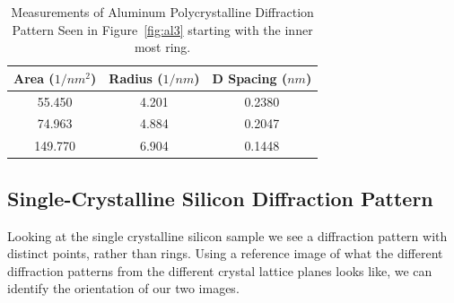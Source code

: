 \documentclass[12pt,a4paper]{article}
\begin{document}
\begin{table}[hct]
  \centering
  \begin{tabular}{c|c|c}
    \hline
    \hline
    Area ($1/nm^2$) & Radius ($1/nm$) & D Spacing ($nm$) \\
    \hline
    55.450 & 4.201 & 0.2380 \\
    74.963 & 4.884 & 0.2047 \\
    149.770 & 6.904   & 0.1448 \\
    \hline
    \hline
  \end{tabular}
  \caption{Measurements of Aluminum Polycrystalline Diffraction Pattern Seen in Figure~\ref{fig:al3} starting with the inner most ring.}
  \label{tbl:rings}
\end{table}



\subsection{Single-Crystalline Silicon Diffraction Pattern} %
\label{sub:single_crystaline}

Looking at the single crystalline silicon sample we see a diffraction pattern with distinct points, rather than rings.  Using a reference image\cite{viz} of what the different diffraction patterns from the different crystal lattice planes looks like, we can identify the orientation of our two images.  
\end{document}
